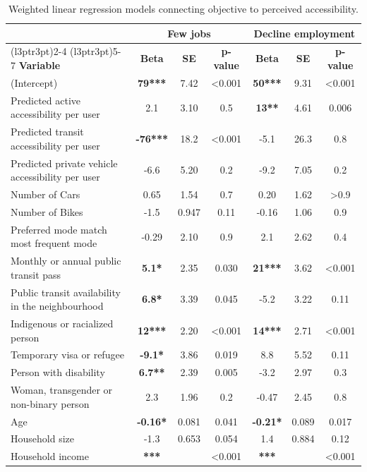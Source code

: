 \documentclass[preprint, 3p,
authoryear]{elsarticle} %
\begin{document}
\begin{table}

\caption{\label{tab:unnamed-chunk-8}\label{tab:linear_models}Weighted linear regression models connecting objective to perceived accessibility.}
\centering
\begin{tabular}[t]{lcccccc}
\toprule
\multicolumn{1}{c}{ } & \multicolumn{3}{c}{\textbf{Few jobs}} & \multicolumn{3}{c}{\textbf{Decline employment}} \\
\cmidrule(l{3pt}r{3pt}){2-4} \cmidrule(l{3pt}r{3pt}){5-7}
\textbf{Variable} & \textbf{Beta} & \textbf{SE} & \textbf{p-value} & \textbf{Beta} & \textbf{SE} & \textbf{p-value}\\
\midrule
(Intercept) & \textbf{79***} & 7.42 & <0.001 & \textbf{50***} & 9.31 & <0.001\\
Predicted active accessibility per user & 2.1 & 3.10 & 0.5 & \textbf{13**} & 4.61 & 0.006\\
Predicted transit accessibility per user & \textbf{-76***} & 18.2 & <0.001 & -5.1 & 26.3 & 0.8\\
Predicted private vehicle accessibility per user & -6.6 & 5.20 & 0.2 & -9.2 & 7.05 & 0.2\\
Number of Cars & 0.65 & 1.54 & 0.7 & 0.20 & 1.62 & >0.9\\
\addlinespace
Number of Bikes & -1.5 & 0.947 & 0.11 & -0.16 & 1.06 & 0.9\\
Preferred mode match most frequent mode & -0.29 & 2.10 & 0.9 & 2.1 & 2.62 & 0.4\\
Monthly or annual public transit pass & \textbf{5.1*} & 2.35 & 0.030 & \textbf{21***} & 3.62 & <0.001\\
Public transit availability in the neighbourhood & \textbf{6.8*} & 3.39 & 0.045 & -5.2 & 3.22 & 0.11\\
Indigenous or racialized person & \textbf{12***} & 2.20 & <0.001 & \textbf{14***} & 2.71 & <0.001\\
\addlinespace
Temporary visa or refugee & \textbf{-9.1*} & 3.86 & 0.019 & 8.8 & 5.52 & 0.11\\
Person with disability & \textbf{6.7**} & 2.39 & 0.005 & -3.2 & 2.97 & 0.3\\
Woman, transgender or non-binary person & 2.3 & 1.96 & 0.2 & -0.47 & 2.45 & 0.8\\
Age & \textbf{-0.16*} & 0.081 & 0.041 & \textbf{-0.21*} & 0.089 & 0.017\\
Household size & -1.3 & 0.653 & 0.054 & 1.4 & 0.884 & 0.12\\
\addlinespace
Household income & \textbf{***} &  & <0.001 & \textbf{***} &  & <0.001\\

\end{tabular}
\end{table}
\end{document}
